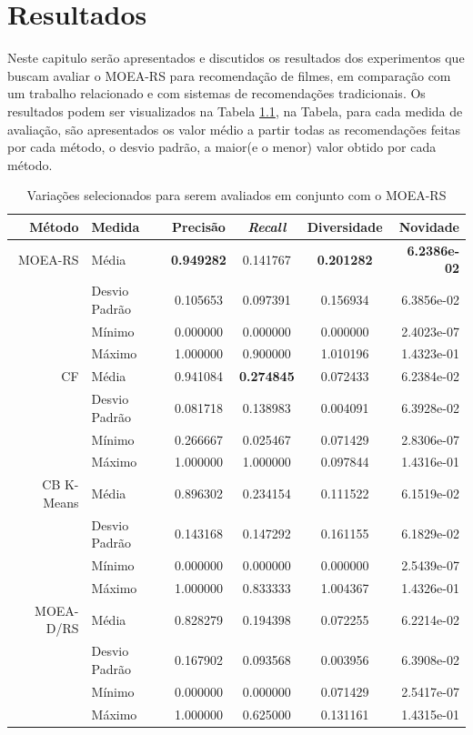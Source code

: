 \chapter{Resultados}

Neste capitulo serão apresentados e discutidos os resultados dos experimentos que buscam avaliar o MOEA-RS para recomendação de filmes, em comparação com um trabalho relacionado e com sistemas de recomendações tradicionais. Os resultados  podem ser visualizados na Tabela \ref{tab:main_results}, na Tabela, para cada medida de avaliação, são apresentados os valor médio a partir todas as recomendações feitas por cada método, o desvio padrão, a maior(e o menor) valor  obtido por cada método.

\begin{table}[h]

\centering
\begin{tabular}{r|l|cccr}Método & Medida & Precisão & \textit{Recall} & Diversidade & Novidade \\ 
\hline                               %
MOEA-RS     & Média         & \textbf{0.949282} & 0.141767 & \textbf{0.201282} & \textbf{6.2386e-02} \\
            & Desvio Padrão & 0.105653 & 0.097391 & 0.156934 & 6.3856e-02 \\
            & Mínimo        & 0.000000 & 0.000000 & 0.000000 & 2.4023e-07 \\
            & Máximo        & 1.000000 & 0.900000 & 1.010196  & 1.4323e-01 \\
\hline  
CF          & Média         & 0.941084 & \textbf{0.274845} & 0.072433 &  6.2384e-02 \\
            & Desvio Padrão & 0.081718 & 0.138983 & 0.004091 & 6.3928e-02 \\
            & Mínimo        & 0.266667 & 0.025467 & 0.071429 & 2.8306e-07 \\
            & Máximo        & 1.000000 & 1.000000 & 0.097844 & 1.4316e-01 \\
\hline  
CB K-Means  & Média         & 0.896302 & 0.234154   & 0.111522 & 6.1519e-02\\
            & Desvio Padrão & 0.143168 & 0.147292   & 0.161155 & 6.1829e-02 \\
            & Mínimo        & 0.000000 & 0.000000   & 0.000000 & 2.5439e-07 \\
            & Máximo        & 1.000000 & 0.833333   & 1.004367 & 1.4326e-01 \\
\hline  
MOEA-D/RS   & Média         & 0.828279  & 0.194398 & 0.072255 & 6.2214e-02\\
            & Desvio Padrão & 0.167902  & 0.093568 & 0.003956 & 6.3908e-02\\
            & Mínimo        & 0.000000  & 0.000000 & 0.071429 & 2.5417e-07 \\
            & Máximo        & 1.000000  & 0.625000 & 0.131161 & 1.4315e-01 \\
\hline  
\end{tabular}
\caption{Variações selecionados para serem avaliados em conjunto com o MOEA-RS}
\label{tab:main_results}
\end{table}

